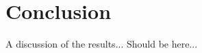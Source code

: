 \newpage 
\section{Conclusion}
\label{sec:conclusion}

A discussion of the results... Should be here...